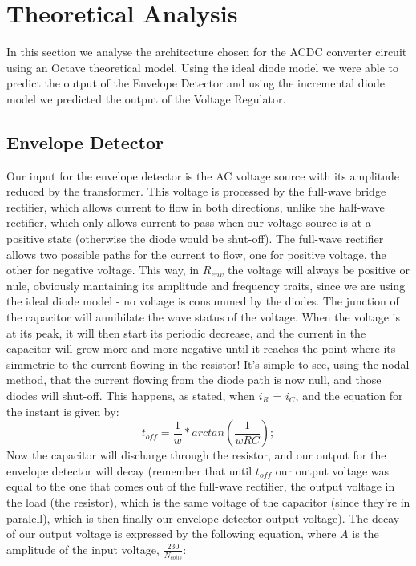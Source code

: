 \section{Theoretical Analysis}
\label{sec:analysis}

In this section we analyse the architecture chosen for the ACDC converter circuit using an Octave theoretical model. Using the ideal diode model we were able to predict the output of the Envelope Detector and using the incremental diode model we predicted the output of the Voltage Regulator.

\subsection{Envelope Detector}
Our input for the envelope detector is the AC voltage source with its amplitude reduced by the transformer. This voltage is processed by the full-wave bridge rectifier, which allows current to flow in both directions, unlike the half-wave rectifier, which only allows current to pass when our voltage source is at a positive state (otherwise the diode would be shut-off). The full-wave rectifier allows two possible paths for the current to flow, one for positive voltage, the other for negative voltage. This way, in $R_{env}$ the voltage will always be positive or nule, obviously mantaining its amplitude and frequency traits, since we are using the ideal diode model - no voltage is consummed by the diodes. The junction of the capacitor will annihilate the wave status of the voltage. When the voltage is at its peak, it will then start its periodic decrease, and the current in the capacitor will grow more and more negative until it reaches the point where its simmetric to the current flowing in the resistor! It's simple to see, using the nodal method, that the current flowing from the diode path is now null, and those diodes will shut-off. This happens, as stated, when $i_{R}$ = $i_{C}$, and the equation for the instant is given by:
\begin{equation}
t_{off} = \frac{1}{w} * arctan(\frac{1}{wRC});
\end{equation}
Now the capacitor will discharge through the resistor, and our output for the envelope detector will decay (remember that until $t_{off}$ our output voltage was equal to the one that comes out of the full-wave rectifier, the output voltage in the load (the resistor), which is the same voltage of the capacitor (since they're in paralell), which is then finally our envelope detector output voltage). The decay of our output voltage is expressed by the following equation, where $A$ is the amplitude of the input voltage, $\frac{230}{N_{coils}}$:
